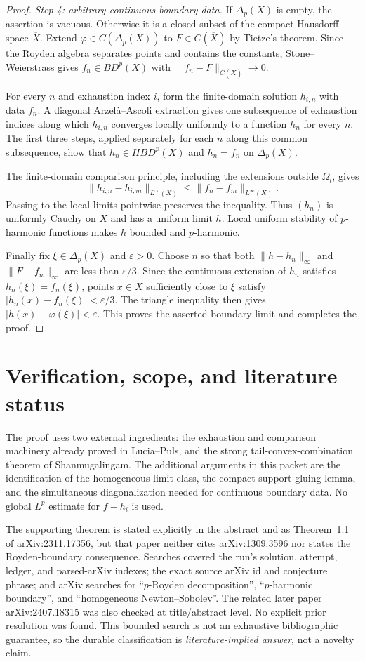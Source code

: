 \documentclass[11pt]{article}
\newcommand{\BD}{BD^p(X)}
\newcommand{\HBD}{HBD^p(X)}
\newcommand{\DeltaP}{\Delta_p(X)}
\newcommand{\Rbar}{\overline X}
\begin{document}
\begin{proof}
\textit{Step 4: arbitrary continuous boundary data.}
If $\DeltaP$ is empty, the assertion is vacuous.  Otherwise it is a closed
subset of the compact Hausdorff space $\Rbar$.  Extend
$\varphi\in C(\DeltaP)$ to $F\in C(\Rbar)$ by Tietze's theorem.  Since the
Royden algebra separates points and contains the constants,
Stone--Weierstrass gives $f_n\in\BD$ with
$\|f_n-F\|_{C(\Rbar)}\to0$.

For every $n$ and exhaustion index $i$, form the finite-domain solution
$h_{i,n}$ with data $f_n$.  A diagonal Arzel\`a--Ascoli extraction gives one
subsequence of exhaustion indices along which $h_{i,n}$ converges locally
uniformly to a function $h_n$ for every $n$.  The first three steps, applied
separately for each $n$ along this common subsequence, show that
$h_n\in\HBD$ and $h_n=f_n$ on $\DeltaP$.

The finite-domain comparison principle, including the extensions outside
$\Omega_i$, gives
\[
 \|h_{i,n}-h_{i,m}\|_{L^\infty(X)}
 \leq\|f_n-f_m\|_{L^\infty(X)}.
\]
Passing to the local limits pointwise preserves the inequality.  Thus
$(h_n)$ is uniformly Cauchy on $X$ and has a uniform limit $h$.  Local
uniform stability of $p$-harmonic functions makes $h$ bounded and
$p$-harmonic.

Finally fix $\xi\in\DeltaP$ and $\varepsilon>0$.  Choose $n$ so that both
$\|h-h_n\|_\infty$ and $\|F-f_n\|_
\infty$ are less than $\varepsilon/3$.  Since the continuous extension of
$h_n$ satisfies $h_n(\xi)=f_n(\xi)$, points $x\in X$ sufficiently close to
$\xi$ satisfy $|h_n(x)-f_n(\xi)|<\varepsilon/3$.  The triangle inequality
then gives $|h(x)-\varphi(\xi)|<\varepsilon$.  This proves the asserted
boundary limit and completes the proof.
\end{proof}

\section{Verification, scope, and literature status}

The proof uses two external ingredients: the exhaustion and comparison
machinery already proved in Lucia--Puls, and the strong tail-convex-combination
theorem of Shanmugalingam.  The additional arguments in this packet are the
identification of the homogeneous limit class, the compact-support gluing
lemma, and the simultaneous diagonalization needed for continuous boundary
data.  No global $L^p$ estimate for $f-h_i$ is used.

The supporting theorem is stated explicitly in the abstract and as
Theorem~1.1 of arXiv:2311.17356, but that paper neither cites arXiv:1309.3596
nor states the Royden-boundary consequence.  Searches covered the run's
solution, attempt, ledger, and parsed-arXiv indexes; the exact source arXiv id
and conjecture phrase; and arXiv searches for ``$p$-Royden decomposition'',
``$p$-harmonic boundary'', and ``homogeneous Newton--Sobolev''.  The related
later paper arXiv:2407.18315 was also checked at title/abstract level.  No
explicit prior resolution was found.  This bounded search is not an
exhaustive bibliographic guarantee, so the durable classification is
\emph{literature-implied answer}, not a novelty claim.
\end{document}
